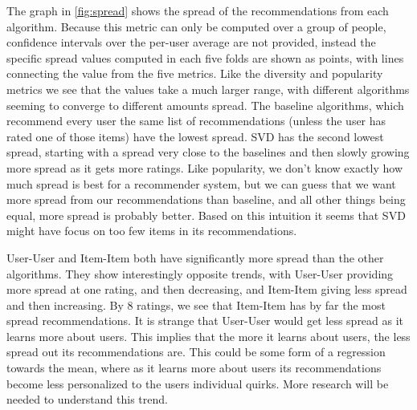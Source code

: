 \documentclass[letterpaper]{sig-alternate}
\begin{document}
  The graph in \ref{fig:spread} shows the spread of the recommendations from each algorithm.
  Because this metric can only be computed over a group of people, confidence intervals over the per-user average are not provided, instead the specific spread values computed in each five folds are shown as points, with lines connecting the value from the five metrics.
  Like the diversity and popularity metrics we see that the values take a much larger range, with different algorithms seeming to converge to different amounts spread.
  The baseline algorithms, which recommend every user the same list of recommendations (unless the user has rated one of those items) have the lowest spread.
  SVD has the second lowest spread, starting with a spread very close to the baselines and then slowly growing more spread as it gets more ratings.
  Like popularity, we don't know exactly how much spread is best for a recommender system, but we can guess that we want more spread from our recommendations than baseline, and all other things being equal, more spread is probably better.
  Based on this intuition it seems that SVD might have focus on too few items in its recommendations.

  User-User and Item-Item both have significantly more spread than the other algorithms.
  They show interestingly opposite trends, with User-User providing more spread at one rating, and then decreasing, and Item-Item giving less spread and then increasing.
  By 8 ratings, we see that Item-Item has by far the most spread recommendations.
  It is strange that User-User would get less spread as it learns more about users.
  This implies that the more it learns about users, the less spread out its recommendations are.
  This could be some form of a regression towards the mean, where as it learns more about users its recommendations become less personalized to the users individual quirks.
  More research will be needed to understand this trend.
  
\end{document}
